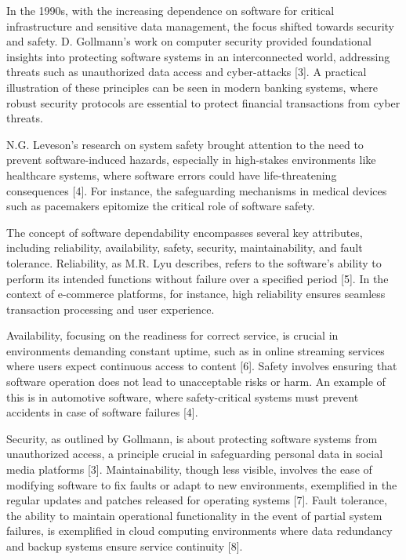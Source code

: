 \documentclass[sigconf]{acmart}
\begin{document}
In the 1990s, with the increasing dependence on software for critical infrastructure and sensitive data management, the focus shifted towards security and safety. D. Gollmann's work on computer security provided foundational insights into protecting software systems in an interconnected world, addressing threats such as unauthorized data access and cyber-attacks [3]. A practical illustration of these principles can be seen in modern banking systems, where robust security protocols are essential to protect financial transactions from cyber threats.

N.G. Leveson's research on system safety brought attention to the need to prevent software-induced hazards, especially in high-stakes environments like healthcare systems, where software errors could have life-threatening consequences [4]. For instance, the safeguarding mechanisms in medical devices such as pacemakers epitomize the critical role of software safety.

The concept of software dependability encompasses several key attributes, including reliability, availability, safety, security, maintainability, and fault tolerance. Reliability, as M.R. Lyu describes, refers to the software's ability to perform its intended functions without failure over a specified period [5]. In the context of e-commerce platforms, for instance, high reliability ensures seamless transaction processing and user experience.

Availability, focusing on the readiness for correct service, is crucial in environments demanding constant uptime, such as in online streaming services where users expect continuous access to content [6]. Safety involves ensuring that software operation does not lead to unacceptable risks or harm. An example of this is in automotive software, where safety-critical systems must prevent accidents in case of software failures [4].

Security, as outlined by Gollmann, is about protecting software systems from unauthorized access, a principle crucial in safeguarding personal data in social media platforms [3]. Maintainability, though less visible, involves the ease of modifying software to fix faults or adapt to new environments, exemplified in the regular updates and patches released for operating systems [7]. Fault tolerance, the ability to maintain operational functionality in the event of partial system failures, is exemplified in cloud computing environments where data redundancy and backup systems ensure service continuity [8].
\end{document}
